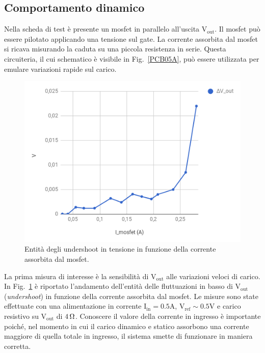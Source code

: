\subsection{Comportamento dinamico}

Nella scheda di test è presente un mosfet in parallelo all'uscita $\mathrm{V_{out}}$. Il mosfet pu\`o essere pilotato applicando una tensione sul gate. La corrente assorbita dal mosfet si ricava misurando la caduta su una piccola resistenza in serie. Questa circuiteria, il cui schematico \`e visibile in Fig.~\ref{PCB05A}, pu\`o essere utilizzata per emulare variazioni rapide sul carico. 

\begin{figure}[!hbt]
\centering
\includegraphics[scale=.5]{Immagini/SLDO5singlepulse}
\caption{Entità degli undershoot in tensione in funzione della corrente assorbita dal mosfet.}
\label{SLDO5singlepulse}
\end{figure}
La prima misura di interesse è la sensibilità di $\mathrm{V_{out}}$ alle variazioni veloci di carico.
In Fig.~\ref{SLDO5singlepulse} è riportato l'andamento dell'entit\`a delle fluttuazioni in basso di $\mathrm{V_{out}}$ ({\em undershoot}) in funzione della corrente assorbita dal mosfet.
Le misure sono state effettuate con una alimentazione in corrente $\mathrm{I_{in} = 0.5 A}$, $\mathrm{V_{ref} \sim 0.5 V}$ e carico resistivo su $\mathrm{V_{out}}$ di $4{\rm \, \Omega}$. 
Conoscere il valore della corrente in ingresso è importante poiché, nel momento in cui il carico dinamico e statico assorbono una corrente maggiore di quella totale in ingresso, il sistema smette di funzionare in maniera corretta.

